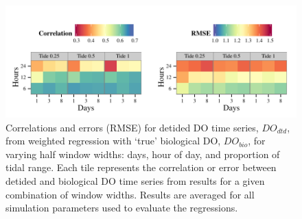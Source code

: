 \documentclass[letterpaper,12pt,oneside]{article}\usepackage[]{graphicx}\usepackage[]{color}
\makeatletter
\def\maxwidth{ %
  \ifdim\Gin@nat@width>\linewidth
    \linewidth
  \else
    \Gin@nat@width
  \fi
}
\newenvironment{knitrout}{}{} %
\makeatother
\begin{document}
\centering\vspace*{\fill}
\begin{knitrout}
\color{fgcolor}\begin{figure}[!ht]


{\centering \includegraphics[width=\maxwidth]{figure/err_surf2} 

}

\caption[Correlations and errors (\ac{RMSE}) for detided \ac{DO} time series, $DO_{dtd}$, from weighted regression with `true' biological \ac{DO}, $DO_{bio}$, for varying half window widths]{Correlations and errors (\ac{RMSE}) for detided \ac{DO} time series, $DO_{dtd}$, from weighted regression with `true' biological \ac{DO}, $DO_{bio}$, for varying half window widths: days, hour of day, and proportion of tidal range.  Each tile represents the correlation or error between detided and biological \ac{DO} time series from results for a given combination of window widths.  Results are averaged for all simulation parameters used to evaluate the regressions.\label{fig:err_surf2}}
\end{figure}


\end{knitrout}
\vfill
\clearpage
\end{document}

